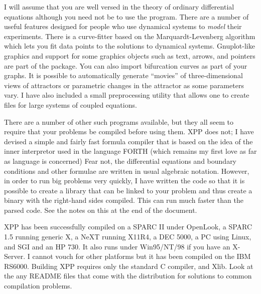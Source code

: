 \documentclass{article}
\begin{document}
 
I will assume that you are well versed in the theory of ordinary differential
 equations although you need not be to use the program.  
There are a number of useful features designed for people who use
dynamical systems to {\em model} their experiments.  There is a
curve-fitter based on the Marquardt-Levenberg algorithm which lets you
fit data points to the solutions to dynamical systems.  
Gnuplot-like graphics and
support for some graphics objects such as text, arrows, and
pointers are part of the package. You can also import bifurcation
curves as part of your graphs.
 It is possible to automatically generate ``movies'' of
three-dimensional views of attractors or parametric changes in the
attractor as some parameters vary.    I have
also included a small preprocessing utility that allows one to create
files for large systems of coupled equations. 

There are a number of other such programs available, but they all seem to
 require that your problems be compiled before using them.  XPP does not;
 I have devised a simple and fairly fast formula compiler that is based
 on the idea of the inner interpretor used in the language FORTH (which
 remains my first love as far as language is concerned)  Fear not, the
 differential equations and boundary conditions and other formulae are
 written in usual algebraic notation.  However, in order to run big
problems very quickly, I have written the code so that it is possible
to create a library that can be linked to your problem and thus create
a binary with the right-hand sides compiled.  This can run much faster
than the parsed code.  See the notes on this at the end of the
document. 




XPP has been successfully compiled on a SPARC II under OpenLook, a SPARC
 1.5 running generic X, a NeXT running X11R4, a DEC 5000, a PC using
Linux, and SGI and an HP 730. It also runs under Win95/NT/98 if you
have an X-Server. 
  I cannot vouch for other platforms but it has been compiled on the
 IBM RS6000. Building XPP requires only the standard C compiler,
 and Xlib.  Look at the any README files that come with the
distribution for solutions to common compilation problems.
\end{document}
